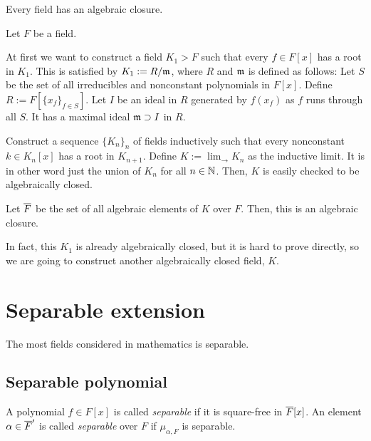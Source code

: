 \documentclass{../exp}
\begin{document}
\begin{thm}
Every field has an algebraic closure.
\end{thm}
\begin{pf}
Let $F$ be a field.

At first we want to construct a field $K_1>F$ such that every $f\in F[x]$ has a root in $K_1$.
This is satisfied by $K_1:=R/\mathfrak{m}$, where $R$ and $\mathfrak{m}$ is defined as follows:
Let $S$ be the set of all irreducibles and nonconstant polynomials in $F[x]$.
Define $R:=F[\{x_f\}_{f\in S}]$.
Let $I$ be an ideal in $R$ generated by $f(x_f)$ as $f$ runs through all $S$.
It has a maximal ideal $\mathfrak{m}\supset I$ in $R$.

Construct a sequence $\{K_n\}_n$ of fields inductively such that every nonconstant $k\in K_n[x]$ has a root in $K_{n+1}$.
Define $K:=\lim_{\to}K_n$ as the inductive limit.
It is in other word just the union of $K_n$ for all $n\in\mathbb{N}$.
Then, $K$ is easily checked to be algebraically closed.

Let $\overline F$ be the set of all algebraic elements of $K$ over $F$.
Then, this is an algebraic closure.
\end{pf}
\begin{rmk}
In fact, this $K_1$ is already algebraically closed, but it is hard to prove directly, so we are going to construct another algebraically closed field, $K$.
\end{rmk}






























\section{Separable extension}

The most fields considered in mathematics is separable.

\subsection{Separable polynomial}
\begin{defn}
A polynomial $f\in F[x]$ is called \emph{separable} if it is square-free in $\overline F[x]$.
An element $\alpha\in\overline F'$ is called \emph{separable} over $F$ if $\mu_{\alpha,F}$ is separable.
\end{defn}
\end{document}
